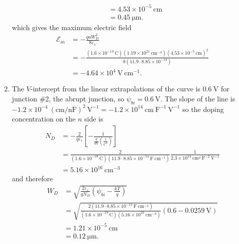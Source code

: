 \documentclass{article}
\begin{document}
\begin{enumerate}
{\begin{align*}
              &= 4.53 \times 10^{-5} ~\mathrm{cm} \\
              &= 0.45 ~\mathrm{\mu m}.
        \end{align*}
        which gives the maximum electric field
        \begin{align*}
          \mathscr{E}_m &= -\frac{q a W_D^2}{8 \varepsilon_s} \\
                        &= -\frac{(1.6 \times 10^{-19} ~\mathrm{C})
                                  (1.19 \times 10^{21} ~\mathrm{cm}^{-4})
                                  (4.53 \times 10^{-5} ~\mathrm{cm})^2}
                                 {8 (11.9 \cdot 8.85 \times 10^{-14})} \\
                        &= -4.64 \times 10^{4} ~\mathrm{V}~\mathrm{cm}^{-1}.
        \end{align*}
       }
  \item{The $V$-intercept from the linear extrapolations of the curve is
        $0.6 ~\mathrm{V}$ for junction \#2, the abrupt junction,
        so $\psi_{bi} = 0.6 ~\mathrm{V}$. The slope of the line is 
        $-1.2 \times 10^{-4} ~(\mathrm{cm} / \mathrm{nF})^2 ~\mathrm{V}^{-1}=
         -1.2 \times 10^{14} ~\mathrm{cm} ~\mathrm{F}^{-1} ~\mathrm{V}^{-1}$ so the doping 
        concentration on the $n$ side is
        \begin{align*}
          N_D &= -\frac{2}{q \varepsilon_s}\left[-\frac{1}{\frac{d}{dV}\left(\frac{1}{C^2}\right)}\right] \\
              &= \frac{2}{(1.6 \times 10^{-19} ~\mathrm{C})(11.9 \cdot 8.85 \times 10^{-14} ~\mathrm{F}~\mathrm{cm}^{-1})}
                 \frac{1}{2.3 \times 10^{14} ~\mathrm{cm}^{4} ~\mathrm{F}^{-2} ~\mathrm{V}^{-1}} \\
              &= 5.16 \times 10^{16} ~\mathrm{cm}^{-3}
        \end{align*}
        and therefore
        \begin{align*}
          W_D &= \sqrt{\frac{2 \varepsilon_s}{q N_D}\left(\psi_{bi} - \frac{kT}{q}\right)} \\
              &= \sqrt{\frac{2 (11.9 \cdot 8.85 \times 10^{-14} ~\mathrm{F} ~\mathrm{cm}^{-1})}
                            {(1.6 \times 10^{-19} ~\mathrm{C})
                             (5.16 \times 10^{16} ~\mathrm{cm}^{-3})}
                       (0.6 - 0.0259 ~\mathrm{V})} \\
              &= 1.21 \times 10^{-5} ~\mathrm{cm} \\
              &= 0.12 ~\mathrm{\mu m}.

\end{align*}}
\end{enumerate}
\end{document}
